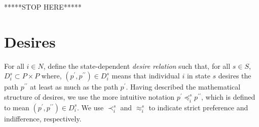 \documentclass[
11pt,
titlepage,
reqno,
]{article}%
\theoremstyle{definition}
\begin{document}
%	
%	


*****STOP HERE*****

\section{Desires} \label{sec: desires}
	For all $i\in N$, define the state-dependent \textit{desire relation} such that, for all $s\in S$,   $D_i^s\subset P\times P$ where, $(p^\prime,p^{\prime\prime})\in D_i^s$ means that  individual $i$ in state $s$ desires the path $p^{\prime\prime}$ at least as much as the path $p^\prime$. 
	Having described the mathematical structure of desires, we use the more intuitive notation $p^\prime\preceq_i^s p^{\prime\prime}$, which is defined to mean $(p^\prime,p^{\prime\prime})\in D_i^s$. 
	We use $\prec_i^s$ and $\approx_i^s$ to indicate strict preference and indifference, respectively. 
	
\end{document}
